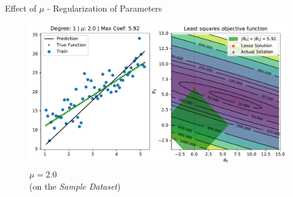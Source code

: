 \documentclass{beamer}
\begin{document}
\begin{frame}{Effect of $\mu$ - Regularization of Parameters}
\vspace{0.4cm}
\begin{figure}\includegraphics[width=0.9\linewidth]{../assets/lasso-regression/figures/lasso_2.0.pdf}\caption{$\mu = 2.0$\\(on the \emph{Sample Dataset})}
\end{figure}
\end{frame}

%	


%
%
%
%
%
%
%
%
%
%
\end{document}
